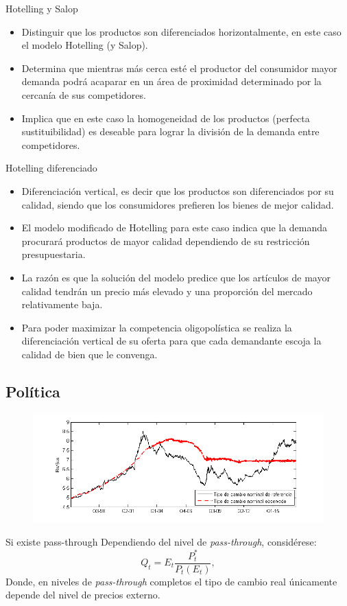 \documentclass[12pt]{beamer}
\begin{document}
\begin{frame}{Hotelling y Salop}
\begin{itemize}
\item Distinguir que los productos son diferenciados horizontalmente, en este caso el modelo Hotelling (y Salop).
\item Determina que mientras más cerca esté el productor del consumidor mayor demanda podrá acaparar en un área de proximidad determinado por la cercanía de sus competidores.
\item Implica que en este caso la homogeneidad de los productos (perfecta sustituibilidad) es deseable para lograr la división de la demanda entre competidores. 
\end{itemize}
\end{frame}

\begin{frame}{Hotelling diferenciado}
\begin{itemize}
\item Diferenciación vertical, es decir que los productos son diferenciados por su calidad, siendo que los consumidores prefieren los bienes de mejor calidad. 
\item El modelo modificado de Hotelling para este caso indica que la demanda procurará productos de mayor calidad dependiendo de su restricción presupuestaria.
\item La razón es que la solución del modelo predice que los artículos de mayor calidad tendrán un precio más elevado y una proporción del mercado relativamente baja.
\item Para poder maximizar la competencia oligopolística se realiza la diferenciación vertical de su oferta para que cada demandante escoja la calidad de bien que le convenga.
\end{itemize}
\end{frame}

\subsection[Política]{Política}
\begin{frame}
\begin{figure}
\centering
        \includegraphics[width=\textwidth]{tcn}
        \label{tcn}
\end{figure}
\end{frame}

\begin{frame}{Si existe pass-through}
Dependiendo del nivel de \emph{pass-through}, considérese:
\begin{equation}
Q_t=E_t\frac{P_t^*}{P_t(E_t)},
\end{equation}
Donde, en niveles de \emph{pass-through} completos el tipo de cambio real únicamente depende del nivel de precios externo.
\end{frame}
\end{document}
